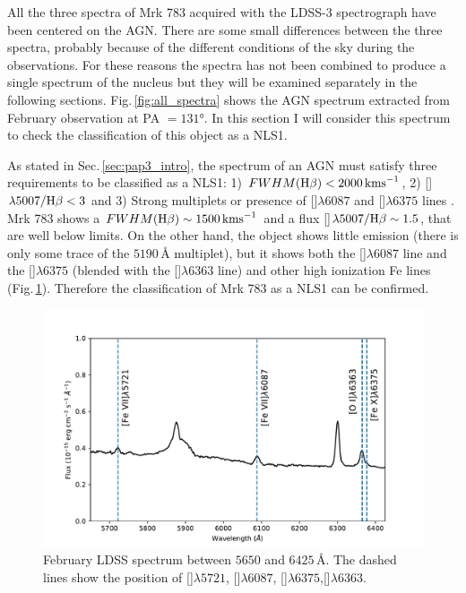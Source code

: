 \documentclass[../main.tex]{subfiles}
\begin{document}
All the three spectra of Mrk 783 acquired with the LDSS-3 spectrograph have been centered on the AGN.
There are some small differences between the three spectra, probably because of the different conditions of the sky during the observations. 
For these reasons the spectra has not been combined to produce a single spectrum of the nucleus but they will be examined separately in the following sections.
Fig.\,\ref{fig:all_spectra} shows the AGN spectrum extracted from February observation at PA $=\ang{131}$.
In this section I will consider this spectrum to check the classification of this object as a NLS1.

As stated in Sec.\,\ref{sec:pap3_intro}, the spectrum of an AGN must satisfy three requirements to be classified as a NLS1: 1) $FWHM(\Hb)<2000\,\si{\kms}$, 2) []$\lambda5007/\Hb<3$ \citep{Osterbrock85} and 3) Strong  multiplets or presence of []$\lambda6087$ and []$\lambda6375$ lines \citep{Goodrich89}.
Mrk 783 shows a $FWHM(\Hb)\sim1500\,\si{\kms}$ and a flux []$\lambda5007/\Hb\sim 1.5$, that are well below \citet{Osterbrock85} limits.
On the other hand, the object shows little  emission (there is only some trace of the $5190\,\si{\angstrom}$ multiplet), but it shows both the []$\lambda6087$ line and the []$\lambda6375$ (blended with the []$\lambda6363$ line) and other high ionization Fe lines (Fig.\,\ref{fig:fe_lines}).
Therefore the classification of Mrk 783 as a NLS1 can be confirmed.

\begin{figure}
\centering
\includegraphics[width=\textwidth]{images/paper3/Fe_lines.pdf} 
\caption[]{February LDSS spectrum between $5650$ and $6425\,\si{\angstrom}$. The dashed lines show the position of []$\lambda5721$,  []$\lambda6087$, []$\lambda6375$,[]$\lambda6363$.} 
\label{fig:fe_lines}
\end{figure} 
\end{document}

